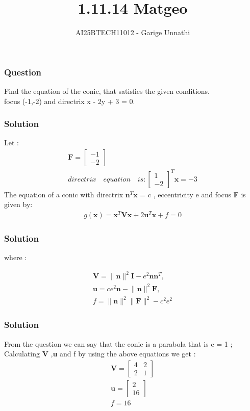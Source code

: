 \documentclass{beamer}
\title{1.11.14 Matgeo}
\author{AI25BTECH11012 - Garige Unnathi}
\date{}
\begin{document}
\frame{\titlepage}

\begin{frame}
\frametitle{Question}
Find the equation of the conic, that satisfies the given conditions. \\ 
focus (-1,-2) and directrix x - 2y + 3 = 0.
\end{frame}


\begin{frame}
\frametitle{Solution}
Let :
\begin{align}
    \textbf{F} = \begin{bmatrix}-1\\-2\end{bmatrix}\\
    directrix \quad equation \quad is : \begin{bmatrix}1\\-2\end{bmatrix}^{T}\textbf{x} = -3
\end{align}
The equation of a conic with directrix $\textbf{n}^{T}\textbf{x}$ = c , eccentricity e and focus \textbf{F} is given by:
\begin{align}
    g(\textbf{x}) = \textbf{x}^{T}\textbf{V}\textbf{x} + 2\textbf{u}^{T}\textbf{x} + f  = 0
\end{align}
\end{frame}

\begin{frame}
\frametitle{Solution}
where :

\begin{align*}
\textbf{V} = \lVert \textbf{n} \rVert^{2} \textbf{I} - e^{2}\textbf{n}\textbf{n}^{T} , \\
\textbf{u} = ce^{2}\textbf{n} - \lVert \textbf{n} \rVert^{2}\textbf{F} , \\
f = \lVert \textbf{n} \rVert^{2}\lVert \textbf{F} \rVert^{2} - c^{2}e^{2}
\end{align*}

\end{frame}

\begin{frame}
\frametitle{Solution}
From the question we can say that the conic is a parabola that is e = 1 ;\\
Calculating \textbf{V} ,\textbf{u} and f by using the above equations we get :
\begin{align}
   \textbf{V} = \begin{bmatrix}4 & 2\\2 & 1\end{bmatrix}\\
   \textbf{u} = \begin{bmatrix}2\\16\end{bmatrix}\\
   f = 16
\end{align}
\end{frame}
\end{document}
